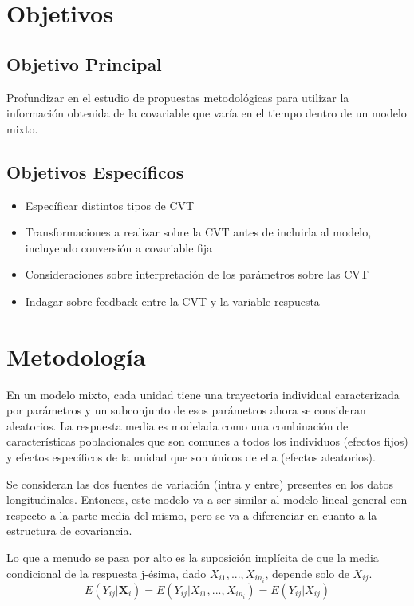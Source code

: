 \documentclass[12pt]{article}
\def\cvt{covariable que varía en el tiempo}
\def\xseqn{$X_{i1}, ..., X_{in_i}$}
\begin{document}
\newpage
\section{Objetivos}

\subsection{Objetivo Principal}

Profundizar en el estudio de propuestas metodológicas para utilizar la información obtenida de la \cvt{} dentro de un
modelo mixto.

\subsection{Objetivos Específicos}

\begin{itemize}
	\item Específicar distintos tipos de CVT
	\item Transformaciones a realizar sobre la CVT antes de incluirla al modelo, incluyendo conversión a covariable fija
	\item Consideraciones sobre interpretación de los parámetros sobre las CVT
	\item Indagar sobre feedback entre la CVT y la variable respuesta
\end{itemize}

\newpage
\section{Metodología}

En un modelo mixto, cada unidad tiene una trayectoria individual caracterizada por parámetros y un subconjunto de esos
parámetros ahora se consideran aleatorios. La respuesta media es modelada como una combinación de características
poblacionales que son comunes a todos los individuos (efectos fijos) y efectos específicos de la unidad que son únicos de
ella (efectos aleatorios).

Se consideran las dos fuentes de variación (intra y entre) presentes en los datos longitudinales. Entonces, este modelo va
a ser similar al modelo lineal general con respecto a la parte media del mismo, pero se va a diferenciar en cuanto a la
estructura de covariancia.

Lo que a menudo se pasa por alto es la suposición implícita de que la media
condicional de la respuesta j-ésima, dado \xseqn{}, depende solo de $X_{ij}$.
\begin{equation}
\label{esperanza}
	E(Y_{ij}|\bm{X}_i) = E(Y_{ij}|X_{i1}, ..., X_{in_i}) = E(Y_{ij}|X_{ij})
\end{equation}
\end{document}
